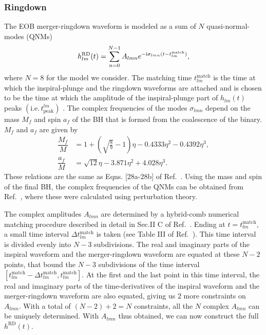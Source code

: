 \documentclass[aps,
prd,
amsmath,
amssymb,
twocolumn,
floatfix,
groupedaddress]{revtex4-1}
\newcommand{\Sum}{\displaystyle\sum\limits}
\newcommand{\ii}{{\rm i}}
\newcommand{\peak}{\mathrm{peak}}
\newcommand{\RD}{\mathrm{RD}}
\def\l({\left(}
\def\r){\right)}
\begin{document}
\subsubsection{Ringdown}\label{sec:level3:RD}
The EOB merger-ringdown waveform is modeled as a sum of $N$ quasi-normal-modes (QNMs) \citep{EOBNRdevel01,EOBNRdevel02,EOBNRdevel04,BHRDQNMs}
\begin{equation}
h_{lm}^{\RD}(t) = \Sum^{N-1}_{n=0}A_{lmn}e^{-\ii\sigma_{lmn}(t-t_{lm}^{\mathrm{match}})},
\end{equation}
where $N=8$ for the model we consider. The matching time $t_{lm}^{\mathrm{match}}$ is the time at which the inspiral-plunge and the ringdown waveforms are attached and is chosen to be the time at which the amplitude of the inspiral-plunge part of $h_{lm}(t)$ peaks $\l(\mathrm{i.e.}\, t^{lm}_{\peak}\r)$ \citep{EOBNRdevel01,BuonannoEOBv2Main}. The complex frequencies of the modes  $\sigma_{lmn}$  depend on the mass $M_f$ and spin $a_f$ of the BH that is formed from the coalescence of the binary. $M_f$ and $a_f$ are given by
\begin{subequations}
\begin{align}
\dfrac{M_f}{M} &= 1 + \l(\sqrt{\frac{8}{9}}-1\r)\eta - 0.4333\eta^2 - 0.4392\eta^3,\\
\dfrac{a_f}{M} &= \sqrt{12}\eta - 3.871\eta^2 + 4.028\eta^3.
\end{align}
\end{subequations}
These relations are the same as Eqns. [28a-28b] of Ref.~\citep{BuonannoEOBv2Main}. Using the mass and spin of the final BH, the complex frequencies of the QNMs can be obtained from Ref.~\citep{BHRDQNMs}, where these were calculated using perturbation theory. 

The complex amplitudes $A_{lmn}$ are determined by a hybrid-comb numerical matching procedure described in detail in Sec.II C of Ref.~\citep{BuonannoEOBv2Main}. Ending at $t=t_{lm}^{\mathrm{match}}$, a small time interval $\Delta t^{\mathrm{match}}_{lm}$ is taken (see Table III of Ref.~\citep{BuonannoEOBv2Main}). This time interval is divided evenly into $N-3$ subdivisions. The real and imaginary parts of the inspiral waveform and the merger-ringdown waveform are equated at these $N-2$ points, that bound the $N-3$ subdivisions of the time interval $\left[t_{lm}^{\mathrm{match}}-\Delta t^{\mathrm{match}}_{lm},t_{lm}^{\mathrm{match}}\right]$. At the first and the last point in this time interval, the real and imaginary parts of the time-derivatives of the inspiral waveform and the merger-ringdown waveform are also equated, giving us $2$ more constraints on $A_{lmn}$. With a total of $(N-2)+2=N$ constraints, all the $N$ complex $A_{lmn}$ can be uniquely determined.
With $A_{lmn}$ thus obtained, we can now construct the full $h^{\RD}(t)$.
\end{document}
